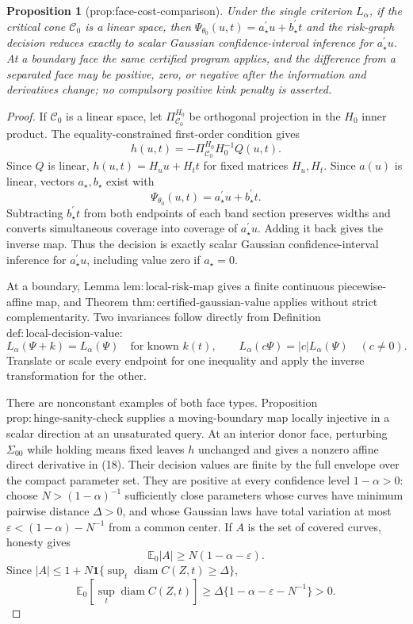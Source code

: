 \documentclass{article}
\newtheorem{proposition}{Proposition}
\begin{document}
\begin{proposition}[prop:face-cost-comparison]\label{prop:face-cost-comparison}
Under the single criterion \(L_\alpha\), if the critical cone \(\mathcal C_0\) is a linear space, then \(\Psi_{\theta_0}(u,t)=a_{\star}^{\prime}u+b_{\star}^{\prime}t\) and the risk-graph decision reduces exactly to scalar Gaussian confidence-interval inference for \(a_{\star}^{\prime}u\). At a boundary face the same certified program applies, and the difference from a separated face may be positive, zero, or negative after the information and derivatives change; no compulsory positive kink penalty is asserted.
\end{proposition}
\begin{proof}
If \(\mathcal C_0\) is a linear space, let \(\Pi_{\mathcal C_0}^{H_0}\) be orthogonal projection in the \(H_0\) inner product.  The equality-constrained first-order condition gives
\[
 h(u,t)=-\Pi_{\mathcal C_0}^{H_0}H_0^{-1}Q(u,t).
\tag{17}
\]
Since \(Q\) is linear, \(h(u,t)=H_uu+H_tt\) for fixed matrices \(H_u,H_t\).  Since \(a(u)\) is linear, vectors \(a_\star,b_\star\) exist with
\[
 \Psi_{\theta_0}(u,t)=a_\star^\prime u+b_\star^\prime t.
\tag{18}
\]
Subtracting \(b_\star^\prime t\) from both endpoints of each band section preserves widths and converts simultaneous coverage into coverage of \(a_\star^\prime u\).  Adding it back gives the inverse map.  Thus the decision is exactly scalar Gaussian confidence-interval inference for \(a_\star^\prime u\), including value zero if \(a_\star=0\).

At a boundary, Lemma \(\mathrm{lem:local\mbox{-}risk\mbox{-}map}\) gives a finite continuous piecewise-affine map, and Theorem \(\mathrm{thm:certified\mbox{-}gaussian\mbox{-}value}\) applies without strict complementarity.  Two invariances follow directly from Definition \(\mathrm{def:local\mbox{-}decision\mbox{-}value}\):
\[
 L_\alpha(\Psi+k)=L_\alpha(\Psi)
 \quad\text{for known }k(t),\qquad
 L_\alpha(c\Psi)=|c|L_\alpha(\Psi)\quad(c\neq0).
\tag{19}
\]
Translate or scale every endpoint for one inequality and apply the inverse transformation for the other.

There are nonconstant examples of both face types.  Proposition \(\mathrm{prop:hinge\mbox{-}sanity\mbox{-}check}\) supplies a moving-boundary map locally injective in a scalar direction at an unsaturated query.  At an interior donor face, perturbing \(\Sigma_{00}\) while holding means fixed leaves \(h\) unchanged and gives a nonzero affine direct derivative in (18).  Their decision values are finite by the full envelope over the compact parameter set.  They are positive at every confidence level \(1-\alpha>0\): choose \(N>(1-\alpha)^{-1}\) sufficiently close parameters whose curves have minimum pairwise distance \(\Delta>0\), and whose Gaussian laws have total variation at most \(\varepsilon<(1-\alpha)-N^{-1}\) from a common center.  If \(A\) is the set of covered curves, honesty gives
\[
 \mathbb E_0|A|\geq N(1-\alpha-\varepsilon).
\]
Since \(|A|\leq1+N\mathbf1\{\sup_t\operatorname{diam}C(Z,t)\geq\Delta\}\),
\[
 \mathbb E_0[\sup_t\operatorname{diam}C(Z,t)]
 \geq\Delta\{1-\alpha-\varepsilon-N^{-1}\}>0.
\tag{20}
\]


\end{proof}
\end{document}
